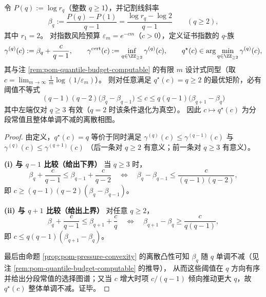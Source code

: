 \begin{proposition}\label{prop:pom-qstar-discrete-variational-threshold}
令 \(P(q):=\log r_q\)（整数 \(q\ge 1\)），并记割线斜率
\[
\beta_q:=\frac{P(q)-P(1)}{q-1}
=\frac{\log r_q-\log 2}{q-1}
\qquad(q\ge 2),
\]
其中 \(r_1=2\)。
对指数风险预算 \(\varepsilon_m=e^{-cm}\)（\(c>0\)），定义证书指数的 \(q\)-族
\[
\gamma^{(q)}(c):=\beta_q+\frac{c}{q-1},
\qquad
\gamma^{\mathrm{cert}}(c):=\inf_{q\in\ZZ_{\ge 2}}\gamma^{(q)}(c),
\qquad
q^\star(c)\in\arg\min_{q\in\ZZ_{\ge 2}}\gamma^{(q)}(c),
\]
其与注 \ref{rem:pom-quantile-budget-computable} 的有限 \(m\) 设计式同型（取 \(c=\lim_{m\to\infty}\frac1m\log(1/\varepsilon_m)\)）。
则对任意满足 \(q^\star(c)=q\ge 2\) 的最优矩阶，必有阈值不等式
\[
\boxed{\;
(q-1)(q-2)\bigl(\beta_q-\beta_{q-1}\bigr)\le c\le q(q-1)\bigl(\beta_{q+1}-\beta_{q}\bigr)\;}
\]
其中左端仅对 \(q\ge 3\) 有效（\(q=2\) 时该条件退化为真空）。
因此 \(c\mapsto q^\star(c)\) 为分段常值且整体单调不减的离散相图。
\end{proposition}
\begin{proof}
由定义，\(q^\star(c)=q\) 等价于同时满足
\(
\gamma^{(q)}(c)\le \gamma^{(q-1)}(c)
\)
与
\(
\gamma^{(q)}(c)\le \gamma^{(q+1)}(c)
\)
（后一条对 \(q\ge 2\) 有意义；前一条对 \(q\ge 3\) 有意义）。

\smallskip\noindent\textbf{(i) 与 \(q-1\) 比较（给出下界）}
当 \(q\ge 3\) 时，
\[
\beta_q+\frac{c}{q-1}\le \beta_{q-1}+\frac{c}{q-2}
\quad\Longleftrightarrow\quad
\beta_q-\beta_{q-1}\le \frac{c}{(q-1)(q-2)},
\]
即 \(c\ge (q-1)(q-2)(\beta_q-\beta_{q-1})\)。

\smallskip\noindent\textbf{(ii) 与 \(q+1\) 比较（给出上界）}
对任意 \(q\ge 2\)，
\[
\beta_q+\frac{c}{q-1}\le \beta_{q+1}+\frac{c}{q}
\quad\Longleftrightarrow\quad
\beta_{q+1}-\beta_q\ge \frac{c}{q(q-1)},
\]
即 \(c\le q(q-1)(\beta_{q+1}-\beta_q)\)。

\smallskip
最后由命题 \ref{prop:pom-pressure-convexity} 的离散凸性可知 \(\beta_q\) 随 \(q\) 单调不减（见注 \ref{rem:pom-quantile-budget-computable} 的推导），
从而这些阈值在 \(q\) 方向有序并给出分段常值的选择图谱；又当 \(c\) 增大时项 \(c/(q-1)\) 倾向推动更大 \(q\)，故 \(q^\star(c)\) 整体单调不减。证毕。
\end{proof}

